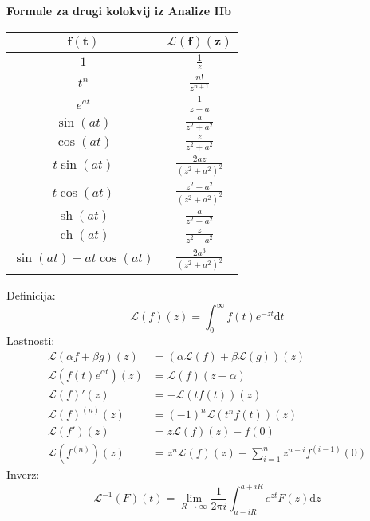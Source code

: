 \documentclass[a4paper,oneside,12pt]{article}
\newcommand{\mytitle}{Formule za drugi kolokvij iz Analize IIb}
\def\nl{\rule[-14pt]{0pt}{35pt}\\}
\def\L{\mathcal{L}}
\begin{document}
\begin{center}
  \bf \Large \mytitle
\end{center}

\parbox{0.5\textwidth}{
  \vspace{20pt}
\begin{tabular}[h]{|c|c|}
  \hline
  $\boldsymbol{f(t)}$ & $\boldsymbol{\L(f)(z)}$ \nl \hline \hline
  $1$ & $\frac{1}{z}$ \nl \hline
  $t^n$ & $\frac{n!}{z^{n+1}}$ \nl \hline
  $e^{at}$ & $\frac{1}{z-a}$ \nl \hline
  $\sin(at)$ & $\frac{a}{z^2+a^2}$ \nl \hline
  $\cos(at)$ & $\frac{z}{z^2+a^2}$ \nl \hline
  $t\sin(at)$ & $\frac{2az}{(z^2+a^2)^2}$ \nl \hline
  $t\cos(at)$ & $\frac{z^2-a^2}{(z^2+a^2)^2}$ \nl \hline
  $\operatorname{sh}(at)$ & $\frac{a}{z^2-a^2}$ \nl \hline
  $\operatorname{ch}(at)$ & $\frac{z}{z^2-a^2}$ \nl \hline
  $\sin(at) - at\cos(at)$ & $\frac{2a^3}{(z^2+a^2)^2}$ \nl \hline
\end{tabular}
}
\parbox{0.5\textwidth}{
  Definicija:
  \[ \L(f)(z) = \int_0^\infty\!\!f(t) e^{-zt}\text{d}t \]
  Lastnosti:
  \begin{align*}
    \L(\alpha f + \beta g)(z) &= (\alpha \L(f) + \beta \L(g))(z)\\
    \L(f(t)e^{\alpha t})(z) &= \L(f)(z-\alpha) \\
    \L(f)'(z) &= -\L(tf(t))(z) \\
    \L(f)^{(n)}(z) &= (-1)^n\L(t^nf(t))(z) \\
    \L(f')(z) &= z\L(f)(z) - f(0)\\
    \L(f^{(n)})(z) &= z^n\L(f)(z) - \sum_{i=1}^{n}z^{n-i}f^{(i-1)}(0)
  \end{align*}
  Inverz:
  \[\L^{-1}(F)(t) = \lim_{R\to\infty}\frac{1}{2\pi
  i}\int_{a-iR}^{a+iR}\!\!e^{zt}F(z)\text{d}z \]
  \vspace{30pt}
}
\end{document}
